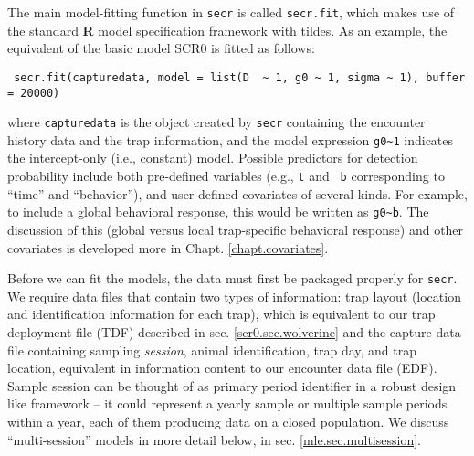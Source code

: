 The main model-fitting function in   \mbox{\tt secr} is called
\mbox{\tt secr.fit}, which 
makes use of the
standard {\bf R} model specification framework with tildes. 
As an example, the equivalent of the
basic model SCR0  is fitted as follows: 
{\small
\begin{verbatim}
 secr.fit(capturedata, model = list(D  ~ 1, g0 ~ 1, sigma ~ 1), buffer = 20000)
\end{verbatim}
}
where \mbox{\tt capturedata} is the  object created by \mbox{\tt secr}
containing the encounter history data and the trap information, and
the model expression \verb#g0~1# indicates the intercept-only (i.e.,
constant) model.  Possible predictors for detection probability
include both pre-defined variables (e.g., \mbox{\tt t} and \mbox{\tt
  b} corresponding to ``time'' and ``behavior''), and user-defined
covariates of several kinds.  For example, to include a global
behavioral response, this would be written as \verb#g0~b#.  The
discussion of this (global versus local trap-specific behavioral
response) and other covariates is developed more in
Chapt. \ref{chapt.covariates}.

Before we can fit the models, the data must first be packaged properly
for 
\mbox{\tt secr}.  
We require data files that contain two types of information:
trap layout (location and
identification information for each trap), which is equivalent to our
trap deployment file (TDF) described in sec. \ref{scr0.sec.wolverine}
and the capture data file containing 
sampling {\it session}, animal identification, trap day, and trap
location,  equivalent in information content to our encounter data file (EDF).
Sample session can be thought of as primary period identifier in a
robust design like framework -- it could represent a yearly sample or
multiple sample periods within a year, each of them producing data on
a closed population. We discuss ``multi-session'' models in more
detail below, in sec. \ref{mle.sec.multisession}.


